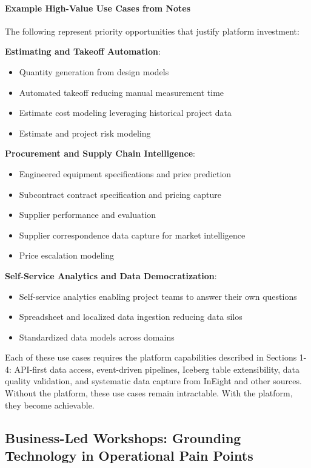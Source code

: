 \documentclass[12pt, a4paper]{article}
\begin{document}
\paragraph{Example High-Value Use Cases from Notes}
The following represent priority opportunities that justify platform investment:

\textbf{Estimating and Takeoff Automation}:
\begin{itemize}[leftmargin=*, nosep]
    \item Quantity generation from design models
    \item Automated takeoff reducing manual measurement time
    \item Estimate cost modeling leveraging historical project data
    \item Estimate and project risk modeling
\end{itemize}

\textbf{Procurement and Supply Chain Intelligence}:
\begin{itemize}[leftmargin=*, nosep]
    \item Engineered equipment specifications and price prediction
    \item Subcontract contract specification and pricing capture
    \item Supplier performance and evaluation
    \item Supplier correspondence data capture for market intelligence
    \item Price escalation modeling
\end{itemize}

\textbf{Self-Service Analytics and Data Democratization}:
\begin{itemize}[leftmargin=*, nosep]
    \item Self-service analytics enabling project teams to answer their own questions
    \item Spreadsheet and localized data ingestion reducing data silos
    \item Standardized data models across domains
\end{itemize}

Each of these use cases requires the platform capabilities described in Sections 1-4: API-first data access, event-driven pipelines, Iceberg table extensibility, data quality validation, and systematic data capture from InEight and other sources. Without the platform, these use cases remain intractable. With the platform, they become achievable.

\subsection{Business-Led Workshops: Grounding Technology in Operational Pain Points}
\end{document}
